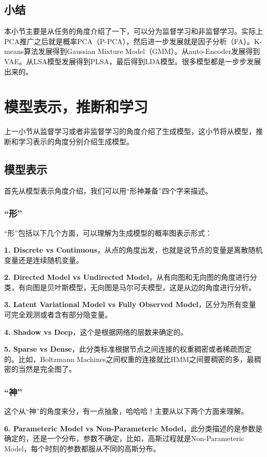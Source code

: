 \documentclass[a4paper]{article}
\begin{document}
\subsection{小结}
本小节主要是从任务的角度介绍了一下，可以分为监督学习和非监督学习。实际上PCA推广之后就是概率PCA（P-PCA），然后进一步发展就是因子分析（FA）。K-means算法发展得到Gaussian Mixture Model（GMM）。从auto-Encoder发展得到VAE。从LSA模型发展得到PLSA，最后得到LDA模型。很多模型都是一步步发展出来的。

\section{模型表示，推断和学习}
上一小节从监督学习或者非监督学习的角度介绍了生成模型，这小节将从模型，推断和学习表示的角度分别介绍生成模型。

\subsection{模型表示}
首先从模型表示角度介绍，我们可以用“形神兼备”四个字来描述。
\subsubsection{“形”}
“形”包括以下几个方面，可以理解为生成模型的概率图表示形式：

\textbf{1. Discrete vs Continuous}，从点的角度出发，也就是说节点的变量是离散随机变量还是连续随机变量。

\textbf{2. Directed Model vs Undirected Model}，从有向图和无向图的角度进行分类，有向图是贝叶斯模型，无向图是马尔可夫模型，这是从边的角度进行分析。

\textbf{3. Latent Variational Model vs Fully Observed Model}，区分为所有变量可完全观测或者含有部分隐变量。

\textbf{4. Shadow vs Deep}，这个是根据网络的层数来确定的。

\textbf{5. Sparse vs Dense}，此分类标准根据节点之间连接的权重稠密或者稀疏而定的。比如，Boltzmann Machines之间权重的连接就比HMM之间要稠密的多，最稠密的当然是完全图了。

\subsubsection{“神”}
这个从“神”的角度来分，有一点抽象，哈哈哈！主要从以下两个方面来理解。

\textbf{6. Parameteric Model vs Non-Parameteric Model}，此分类描述的是参数是确定的，还是一个分布，参数不确定，比如，高斯过程就是Non-Parameteric Model，每个时刻的参数都服从不同的高斯分布。
\end{document}
